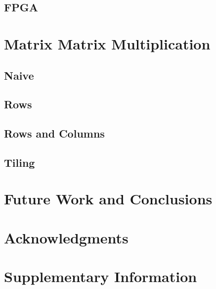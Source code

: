 \documentclass[fleqn,12pt,onecolumn]{ipcc} %
\begin{document}
\subsection{FPGA}

\section{Matrix Matrix Multiplication}

\subsection{Naive}
\label{sec:naive}

\subsection{Rows}
\label{sec:rows}

\subsection{Rows and Columns}
\label{sec:rowscols}

\subsection{Tiling}
\label{sec:tiling}

\section{Future Work and Conclusions}

\section*{Acknowledgments} %





\section*{Supplementary Information} %

\end{document}

